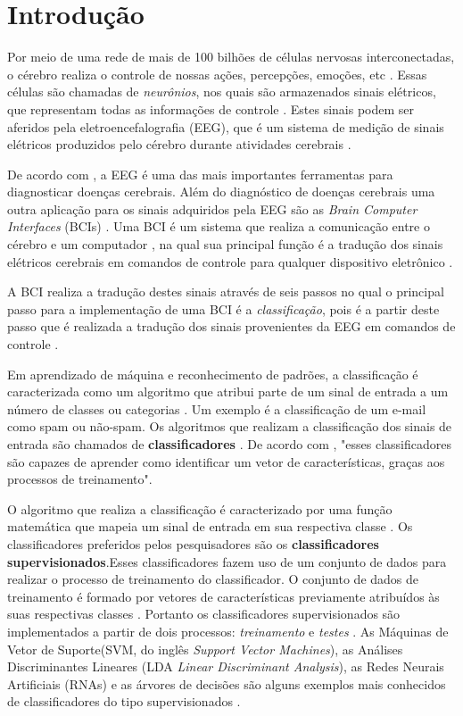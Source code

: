 \chapter[Introdução]{Introdução}

Por meio de uma rede de mais de 100 bilhões de células nervosas interconectadas, o cérebro realiza o controle de nossas ações, percepções, emoções, etc \cite{KANDEL}. Essas células são chamadas de \textit{neurônios}, nos quais são armazenados sinais elétricos, que representam todas as informações de controle \cite{Siulybook}. Estes sinais podem ser aferidos pela eletroencefalografia (EEG), que é um sistema de medição de sinais elétricos produzidos pelo cérebro durante atividades cerebrais \cite{F.Lotte}. 

De acordo com \cite{SIULYDissertacao}, a EEG é uma das mais importantes ferramentas para diagnosticar doenças cerebrais. Além do diagnóstico de doenças cerebrais uma outra aplicação para os sinais adquiridos pela EEG são as \textit{Brain Computer Interfaces} (BCIs) \cite{F.Lotte}. Uma BCI é um
sistema que realiza a comunicação entre o cérebro e um computador \cite{Siulybook}, na qual sua principal função é a tradução dos sinais elétricos cerebrais em comandos de controle para qualquer dispositivo eletrônico \cite{Siulybook}.

A BCI realiza a tradução destes sinais através de seis passos no qual o principal passo para a implementação de uma
BCI é a \textit{classificação}, pois é a partir deste passo que é realizada a tradução dos sinais provenientes da EEG em comandos de controle \cite{MasonAndBirch}.

Em aprendizado de máquina e reconhecimento de padrões, a classificação é caracterizada como um algoritmo que atribui parte de um sinal de entrada a um número de classes ou categorias \cite{brunelli2009template}. Um exemplo é a classificação de um e-mail como spam ou não-spam. Os algoritmos que realizam a classificação dos sinais de entrada são chamados de \textbf{classificadores} \cite{Siulybook}. De acordo com \cite[p. 41]{lottephd}, "esses classificadores são capazes de aprender como identificar um vetor de características, graças aos processos de treinamento".

O algoritmo que realiza a classificação é caracterizado por uma função matemática que mapeia um sinal de entrada em sua respectiva classe \cite{lottephd}. Os classificadores preferidos pelos pesquisadores são os \textbf{classificadores supervisionados}.Esses classificadores fazem uso de um conjunto de dados para realizar o processo de treinamento do classificador. O conjunto de dados de treinamento é formado por vetores de características previamente atribuídos às suas respectivas classes \cite{lottephd}. Portanto os classificadores supervisionados são implementados a partir de dois processos: \textit{treinamento} e \textit{testes} \cite{Siulybook}. As Máquinas de Vetor de Suporte(SVM, do inglês \textit{Support Vector Machines}), as Análises Discriminantes Lineares (LDA \textit{Linear Discriminant Analysis}), as Redes Neurais Artificiais (RNAs) e as árvores de decisões são alguns exemplos mais conhecidos de classificadores do tipo supervisionados \cite{Siulybook}.

